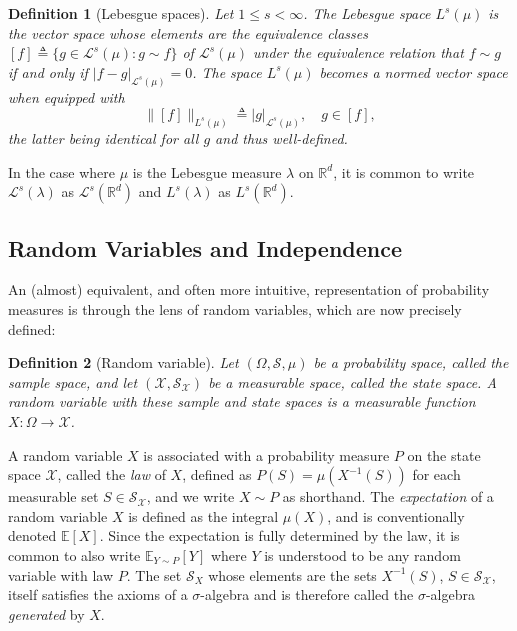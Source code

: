 \documentclass[12pt,paper=letter]{scrreprt}
\newtheorem{definition}{Definition}[chapter]
\def\defeq{\triangleq} %
\begin{document}
\begin{definition}[Lebesgue spaces]
\label{def: Lebesgue space}
Let $1 \leq s < \infty$.
The \emph{Lebesgue space} $L^s(\mu)$ is the vector space whose elements are the equivalence classes $[f] \defeq \{g \in \mathcal{L}^s(\mu) : g \sim f\}$ of $\mathcal{L}^s(\mu)$ under the equivalence relation that $f \sim g$ if and only if $|f-g|_{\mathcal{L}^s(\mu)} = 0$.
The space $L^s(\mu)$ becomes a normed vector space when equipped with 
$$
\|[f]\|_{L^s(\mu)} \defeq |g|_{\mathcal{L}^s(\mu)} , \quad g \in [f] ,
$$
the latter being identical for all $g$ and thus well-defined. 
\end{definition}

\noindent In the case where $\mu$ is the Lebesgue measure $\lambda$ on $\mathbb{R}^d$, it is common to write $\mathcal{L}^s(\lambda)$ as $\mathcal{L}^s(\mathbb{R}^d)$ and $L^s(\lambda)$ as $L^s(\mathbb{R}^d)$.




\subsection{Random Variables and Independence}

An (almost) equivalent, and often more intuitive, representation of probability measures is through the lens of random variables, which are now precisely defined:

\begin{definition}[Random variable]
Let $(\Omega,\mathcal{S},\mu)$ be a probability space, called the \emph{sample space}, and let $(\mathcal{X},\mathcal{S}_{\mathcal{X}})$ be a measurable space, called the \emph{state space}.
A \emph{random variable} with these sample and state spaces is a measurable function $X : \Omega \rightarrow \mathcal{X}$.
\end{definition}

\noindent A random variable $X$ is associated with a probability measure $P$ on the state space $\mathcal{X}$, called the \emph{law} of $X$, defined as $P(S) = \mu(X^{-1}(S))$ for each measurable set $S \in \mathcal{S}_{\mathcal{X}}$, and we write $X \sim P$ as shorthand.
The \emph{expectation} of a random variable $X$ is defined as the integral $\mu(X)$, and is conventionally denoted $\mathbb{E}[X]$.
Since the expectation is fully determined by the law, it is common to also write $\mathbb{E}_{Y \sim P}[Y]$ where $Y$ is understood to be any random variable with law $P$.
The set $\mathcal{S}_X$ whose elements are the sets $X^{-1}(S)$, $S \in \mathcal{S}_{\mathcal{X}}$, itself satisfies the axioms of a $\sigma$-algebra and is therefore called the $\sigma$-algebra \emph{generated} by $X$.
\end{document}

